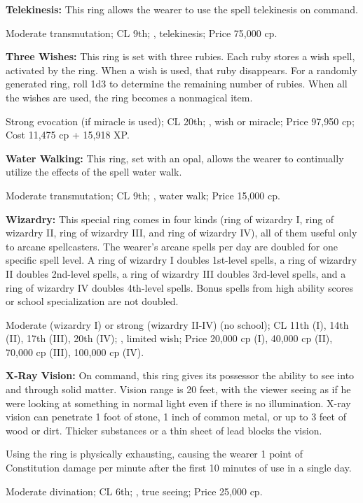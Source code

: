 \textbf{Telekinesis:} This ring allows the wearer to use the spell telekinesis on command.

Moderate transmutation; CL 9th; , telekinesis; Price 75,000 cp.

\textbf{Three Wishes:} This ring is set with three rubies. Each ruby stores a wish spell, activated by the ring. When a wish is used, that ruby disappears. For a randomly generated ring, roll 1d3 to determine the remaining number of rubies. When all the wishes are used, the ring becomes a nonmagical item.

Strong evocation (if miracle is used); CL 20th; , wish or miracle; Price 97,950 cp; Cost 11,475 cp + 15,918 XP.

\textbf{Water Walking:} This ring, set with an opal, allows the wearer to continually utilize the effects of the spell water walk.

Moderate transmutation; CL 9th; , water walk; Price 15,000 cp.

\textbf{Wizardry:} This special ring comes in four kinds (ring of wizardry I, ring of wizardry II, ring of wizardry III, and ring of wizardry IV), all of them useful only to arcane spellcasters. The wearer's arcane spells per day are doubled for one specific spell level. A ring of wizardry I doubles 1st-level spells, a ring of wizardry II doubles 2nd-level spells, a ring of wizardry III doubles 3rd-level spells, and a ring of wizardry IV doubles 4th-level spells. Bonus spells from high ability scores or school specialization are not doubled.

Moderate (wizardry I) or strong (wizardry II-IV) (no school); CL 11th (I), 14th (II), 17th (III), 20th (IV); , limited wish; Price 20,000 cp (I), 40,000 cp (II), 70,000 cp (III), 100,000 cp (IV).

\textbf{X-Ray Vision:} On command, this ring gives its possessor the ability to see into and through solid matter. Vision range is 20 feet, with the viewer seeing as if he were looking at something in normal light even if there is no illumination. X-ray vision can penetrate 1 foot of stone, 1 inch of common metal, or up to 3 feet of wood or dirt. Thicker substances or a thin sheet of lead blocks the vision.

Using the ring is physically exhausting, causing the wearer 1 point of Constitution damage per minute after the first 10 minutes of use in a single day.

Moderate divination; CL 6th; , true seeing; Price 25,000 cp.

